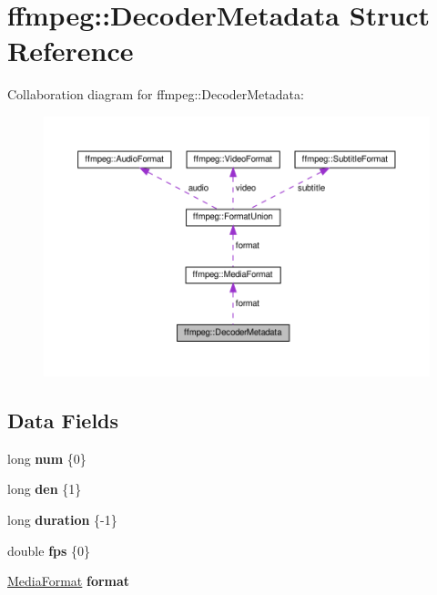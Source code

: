 \hypertarget{structffmpeg_1_1DecoderMetadata}{}\section{ffmpeg\+:\+:Decoder\+Metadata Struct Reference}
\label{structffmpeg_1_1DecoderMetadata}


Collaboration diagram for ffmpeg\+:\+:Decoder\+Metadata\+:
\nopagebreak
\begin{figure}[H]
\begin{center}
\leavevmode
\includegraphics[width=350pt]{structffmpeg_1_1DecoderMetadata__coll__graph}
\end{center}
\end{figure}
\subsection*{Data Fields}
\begin{DoxyCompactItemize}
\item 
\mbox{\label{structffmpeg_1_1DecoderMetadata_a553baf2a3b0b7bfea114afb0b72db8c1}} 
long {\bfseries num} \{0\}
\item 
\mbox{\label{structffmpeg_1_1DecoderMetadata_a39626d7cf2f7662413f187bae7d9ee67}} 
long {\bfseries den} \{1\}
\item 
\mbox{\label{structffmpeg_1_1DecoderMetadata_a48e9ee83ac4875e361c24b3800ab4743}} 
long {\bfseries duration} \{-\/1\}
\item 
\mbox{\label{structffmpeg_1_1DecoderMetadata_a764542bf06d9f23db5e227a38e7a5c4a}} 
double {\bfseries fps} \{0\}
\item 
\mbox{\label{structffmpeg_1_1DecoderMetadata_acbb0ef36fb179a37c6ddb9e52af17d2a}} 
\hyperlink{structffmpeg_1_1MediaFormat}{Media\+Format} {\bfseries format}
\end{DoxyCompactItemize}


